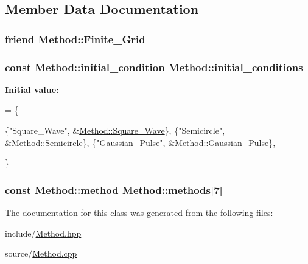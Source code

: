 \subsection{Member Data Documentation}
\hypertarget{classMethod_af5aaa9012b46115a1764f28162f75194}{
\subsubsection[{Finite\-\_\-\-Grid}]{\setlength{\rightskip}{0pt plus 5cm}friend Method\-::\-Finite\-\_\-\-Grid}}\label{classMethod_af5aaa9012b46115a1764f28162f75194}
\hypertarget{classMethod_aac08bb2a7106de6043c82fdd5511626a}{
\subsubsection[{initial\-\_\-conditions}]{\setlength{\rightskip}{0pt plus 5cm}const {\bf Method\-::initial\-\_\-condition} Method\-::initial\-\_\-conditions\hspace{0.3cm}{\ttfamily [static]}}}\label{classMethod_aac08bb2a7106de6043c82fdd5511626a}
{\bfseries Initial value\-:}
\begin{DoxyCode}
= \{
 
\{\textcolor{stringliteral}{"Square\_Wave"}, &\hyperlink{classMethod_ad58a79d346f46c49dfb19c5340871a84}{Method::Square\_Wave}\}, 
\{\textcolor{stringliteral}{"Semicircle"}, &\hyperlink{classMethod_aadbd421df1e1508198bdece1e6048b80}{Method::Semicircle}\},
\{\textcolor{stringliteral}{"Gaussian\_Pulse"}, &\hyperlink{classMethod_a5de1d4fb03ee2a6a4d34baf57ef22e1c}{Method::Gaussian\_Pulse}\},
   
\}
\end{DoxyCode}
\hypertarget{classMethod_af977667f5061f219d7ea8ad1262a6e71}{
\subsubsection[{methods}]{\setlength{\rightskip}{0pt plus 5cm}const {\bf Method\-::method} Method\-::methods\mbox{[}7\mbox{]}\hspace{0.3cm}{\ttfamily [static]}}}\label{classMethod_af977667f5061f219d7ea8ad1262a6e71}


The documentation for this class was generated from the following files\-:\begin{DoxyCompactItemize}
\item 
include/\hyperlink{Method_8hpp}{Method.\-hpp}\item 
source/\hyperlink{Method_8cpp}{Method.\-cpp}\end{DoxyCompactItemize}
